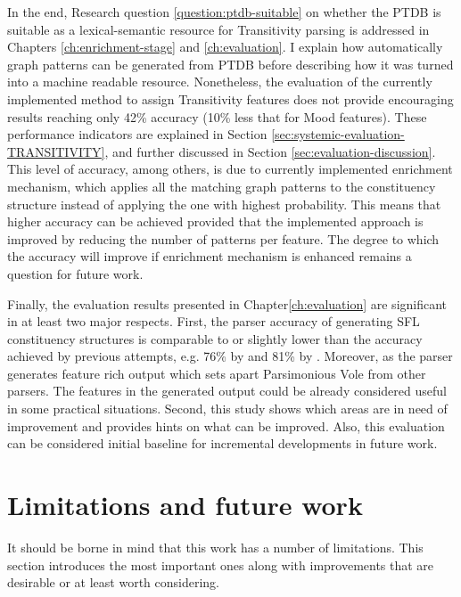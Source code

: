     In the end, Research question \ref{question:ptdb-suitable} on whether the PTDB is suitable as a lexical-semantic resource for Transitivity parsing is addressed in Chapters \ref{ch:enrichment-stage} and \ref{ch:evaluation}. I explain how automatically graph patterns can be generated from PTDB before describing how it was turned into a machine readable resource. Nonetheless, the evaluation of the currently implemented method to assign Transitivity features does not provide encouraging results reaching only 42\% accuracy (10\% less that for Mood features). These performance indicators are explained in Section \ref{sec:systemic-evaluation-TRANSITIVITY}, and further discussed in Section \ref{sec:evaluation-discussion}. This level of accuracy, among others, is due to currently implemented enrichment mechanism, which applies all the matching graph patterns to the constituency structure instead of applying the one with highest probability. This means that higher accuracy can be achieved provided that the implemented approach is improved by reducing the number of patterns per feature. The degree to which the accuracy will improve if enrichment mechanism is enhanced remains a question for future work. 
    
    Finally, the evaluation results presented in Chapter\ref{ch:evaluation} are significant in at least two major respects. First, the parser accuracy of generating SFL constituency structures is comparable to or slightly lower than the accuracy achieved by previous attempts, e.g. 76\% by \citet{Souter1996} and 81\% by \citet{ODonoghue91}. Moreover, as the parser generates feature rich output which sets apart Parsimonious Vole from other parsers. The features in the generated output could be already considered useful in some practical situations.
    Second, this study shows which areas are in need of improvement and provides hints on what can be improved. Also, this evaluation can be considered initial baseline for incremental developments in future work.
    
\section{Limitations and future work}
\label{sec:future-work}

    It should be borne in mind that this work has a number of limitations. This section introduces the most important ones along with improvements that are desirable or at least worth considering.
    
